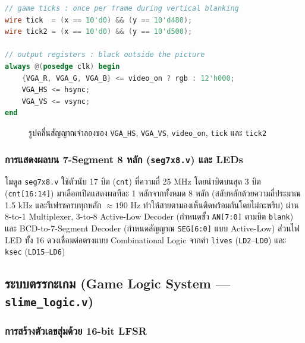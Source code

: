 \begin{lstlisting}[language=Verilog, caption={การสร้างสัญญาณ tick/tick2 และ Output Register ภายใน slime\_top.v}]
// game ticks : once per frame during vertical blanking
wire tick  = (x == 10'd0) && (y == 10'd480);
wire tick2 = (x == 10'd0) && (y == 10'd500);

// output registers : black outside the picture
always @(posedge clk) begin
    {VGA_R, VGA_G, VGA_B} <= video_on ? rgb : 12'h000;
    VGA_HS <= hsync;
    VGA_VS <= vsync;
end
\end{lstlisting}

\begin{figure}[H]
    \centering
    \caption{รูปคลื่นสัญญาณจำลองของ \texttt{VGA\_HS}, \texttt{VGA\_VS}, \texttt{video\_on}, \texttt{tick} และ \texttt{tick2}}
\end{figure}

\subsubsection{การแสดงผลบน 7-Segment 8 หลัก (\texttt{seg7x8.v}) และ LEDs}

โมดูล \texttt{seg7x8.v} ใช้ตัวนับ 17 บิต (\texttt{cnt}) ที่ความถี่ 25 MHz โดยนำบิตบนสุด 3 บิต (\texttt{cnt[16:14]}) มาเลือกเปิดแสดงผลทีละ 1 หลักจากทั้งหมด 8 หลัก (สลับหลักด้วยความถี่ประมาณ 1.5 kHz และรีเฟรชครบทุกหลัก $\approx 190\text{ Hz}$ ทำให้สายตามองเห็นติดพร้อมกันโดยไม่กะพริบ) ผ่าน 8-to-1 Multiplexer, 3-to-8 Active-Low Decoder (กำหนดขั้ว \texttt{AN[7:0]} ตามบิต \texttt{blank}) และ BCD-to-7-Segment Decoder (กำหนดสัญญาณ \texttt{SEG[6:0]} แบบ Active-Low) ส่วนไฟ LED ทั้ง 16 ดวงเชื่อมต่อตรงแบบ Combinational Logic จากค่า \texttt{lives} (\texttt{LD2}--\texttt{LD0}) และ \texttt{ksec} (\texttt{LD15}--\texttt{LD6})

\subsection{ระบบตรรกะเกม (Game Logic System — \texttt{slime\_logic.v})}

\subsubsection{การสร้างตัวเลขสุ่มด้วย 16-bit LFSR}

